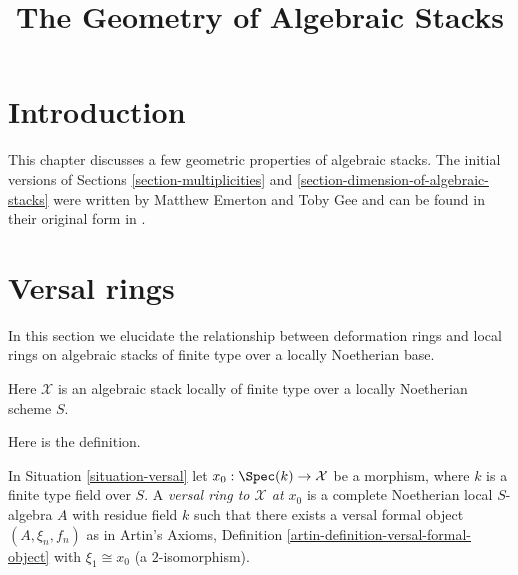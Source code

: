 

%


\title{The Geometry of Algebraic Stacks}


\maketitle

\label{section-phantom}

\tableofcontents

\section{Introduction}
\label{section-introduction}

\noindent
This chapter discusses a few geometric properties of algebraic stacks.
The initial versions of Sections \ref{section-multiplicities} and
\ref{section-dimension-of-algebraic-stacks}
were written by Matthew Emerton and Toby Gee and can be found
in their original form in \cite{Emerton-Gee-dim}.







\section{Versal rings}
\label{section-versal}

\noindent
In this section we elucidate the relationship between deformation rings
and local rings on algebraic stacks of finite type over a locally
Noetherian base.

\begin{situation}
\label{situation-versal}
Here $\mathcal{X}$ is an algebraic stack locally of finite type
over a locally Noetherian scheme $S$.
\end{situation}

\noindent
Here is the definition.

\begin{definition}
\label{definition-versal-ring-at-x}
In Situation \ref{situation-versal} let $x_0 : \Spec(k) \to \mathcal{X}$
be a morphism, where $k$ is a finite type field over $S$.
A {\it versal ring to $\mathcal{X}$ at $x_0$} is a complete
Noetherian local $S$-algebra $A$ with residue field $k$
such that there exists a versal formal object
$(A, \xi_n, f_n)$ as in Artin's Axioms, Definition
\ref{artin-definition-versal-formal-object}
with $\xi_1 \cong x_0$ (a $2$-isomorphism).
\end{definition}

